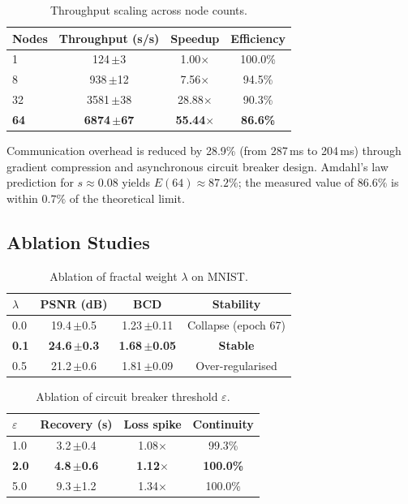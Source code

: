 \documentclass{article}
\begin{document}
\begin{table}[h]
\centering
\caption{Throughput scaling across node counts.}
\label{tab:scaling}
\begin{tabular}{@{}lccc@{}}
\toprule
Nodes & Throughput (s/s) & Speedup & Efficiency \\
\midrule
1  & 124\,{\footnotesize$\pm$3}  & 1.00$\times$ & 100.0\% \\
8  & 938\,{\footnotesize$\pm$12} & 7.56$\times$ & 94.5\%  \\
32 & 3581\,{\footnotesize$\pm$38} & 28.88$\times$ & 90.3\%  \\
\textbf{64} & \textbf{6874\,{\footnotesize$\pm$67}} & \textbf{55.44$\times$} & \textbf{86.6\%}  \\
\bottomrule
\end{tabular}
\end{table}

Communication overhead is reduced by 28.9\% (from 287\,ms to 204\,ms)
through gradient compression and asynchronous circuit breaker design.
Amdahl's law prediction for $s{\approx}0.08$ yields $E(64){\approx}87.2\%$;
the measured value of $86.6\%$ is within $0.7\%$ of the theoretical limit.

\subsection{Ablation Studies}

\begin{table}[h]
\centering
\caption{Ablation of fractal weight $\lambda$ on MNIST.}
\label{tab:ablation_lambda}
\begin{tabular}{@{}lccc@{}}
\toprule
$\lambda$ & PSNR (dB) & BCD & Stability \\
\midrule
0.0 & 19.4\,{\footnotesize$\pm$0.5} & 1.23\,{\footnotesize$\pm$0.11} & Collapse (epoch 67) \\
\textbf{0.1} & \textbf{24.6\,{\footnotesize$\pm$0.3}} & \textbf{1.68\,{\footnotesize$\pm$0.05}} & \textbf{Stable} \\
0.5 & 21.2\,{\footnotesize$\pm$0.6} & 1.81\,{\footnotesize$\pm$0.09} & Over-regularised \\
\bottomrule
\end{tabular}
\end{table}

\begin{table}[h]
\centering
\caption{Ablation of circuit breaker threshold $\varepsilon$.}
\label{tab:ablation_eps}
\begin{tabular}{@{}lccc@{}}
\toprule
$\varepsilon$ & Recovery (s) & Loss spike & Continuity \\
\midrule
1.0 & 3.2\,{\footnotesize$\pm$0.4} & 1.08$\times$ & 99.3\% \\
\textbf{2.0} & \textbf{4.8\,{\footnotesize$\pm$0.6}} & \textbf{1.12$\times$} & \textbf{100.0\%} \\
5.0 & 9.3\,{\footnotesize$\pm$1.2} & 1.34$\times$ & 100.0\% \\
\bottomrule
\end{tabular}
\end{table}
\end{document}
